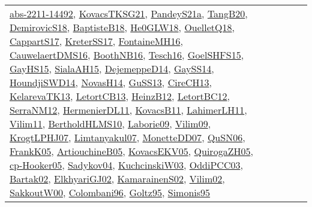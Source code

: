 {\begin{longtable}{lp{3cm}>{\raggedright}p{6cm}>{\raggedright}p{6cm}p{8cm}}
\href{articles/abs-2211-14492.pdf}{abs-2211-14492}\cite{abs-2211-14492}, \href{papers/KovacsTKSG21.pdf}{KovacsTKSG21}\cite{KovacsTKSG21}, \href{articles/PandeyS21a.pdf}{PandeyS21a}\cite{PandeyS21a}, \href{papers/TangB20.pdf}{TangB20}\cite{TangB20}, \href{papers/DemirovicS18.pdf}{DemirovicS18}\cite{DemirovicS18}, \href{articles/BaptisteB18.pdf}{BaptisteB18}\cite{BaptisteB18}, \href{papers/He0GLW18.pdf}{He0GLW18}\cite{He0GLW18}, \href{papers/OuelletQ18.pdf}{OuelletQ18}\cite{OuelletQ18}, \href{papers/CappartS17.pdf}{CappartS17}\cite{CappartS17}, \href{articles/KreterSS17.pdf}{KreterSS17}\cite{KreterSS17}, \href{papers/FontaineMH16.pdf}{FontaineMH16}\cite{FontaineMH16}, \href{papers/CauwelaertDMS16.pdf}{CauwelaertDMS16}\cite{CauwelaertDMS16}, \href{papers/BoothNB16.pdf}{BoothNB16}\cite{BoothNB16}, \href{papers/Tesch16.pdf}{Tesch16}\cite{Tesch16}, \href{articles/GoelSHFS15.pdf}{GoelSHFS15}\cite{GoelSHFS15}, \href{papers/GayHS15.pdf}{GayHS15}\cite{GayHS15}, \href{papers/SialaAH15.pdf}{SialaAH15}\cite{SialaAH15}, \href{papers/DejemeppeD14.pdf}{DejemeppeD14}\cite{DejemeppeD14}, \href{papers/GaySS14.pdf}{GaySS14}\cite{GaySS14}, \href{papers/HoundjiSWD14.pdf}{HoundjiSWD14}\cite{HoundjiSWD14}, \href{articles/NovasH14.pdf}{NovasH14}\cite{NovasH14}, \href{papers/GuSS13.pdf}{GuSS13}\cite{GuSS13}, \href{papers/CireCH13.pdf}{CireCH13}\cite{CireCH13}, \href{papers/KelarevaTK13.pdf}{KelarevaTK13}\cite{KelarevaTK13}, \href{papers/LetortCB13.pdf}{LetortCB13}\cite{LetortCB13}, \href{papers/HeinzB12.pdf}{HeinzB12}\cite{HeinzB12}, \href{papers/LetortBC12.pdf}{LetortBC12}\cite{LetortBC12}, \href{papers/SerraNM12.pdf}{SerraNM12}\cite{SerraNM12}, \href{papers/HermenierDL11.pdf}{HermenierDL11}\cite{HermenierDL11}, \href{articles/KovacsB11.pdf}{KovacsB11}\cite{KovacsB11}, \href{papers/LahimerLH11.pdf}{LahimerLH11}\cite{LahimerLH11}, \href{papers/Vilim11.pdf}{Vilim11}\cite{Vilim11}, \href{papers/BertholdHLMS10.pdf}{BertholdHLMS10}\cite{BertholdHLMS10}, \href{papers/Laborie09.pdf}{Laborie09}\cite{Laborie09}, \href{papers/Vilim09.pdf}{Vilim09}\cite{Vilim09}, \href{papers/KrogtLPHJ07.pdf}{KrogtLPHJ07}\cite{KrogtLPHJ07}, \href{papers/Limtanyakul07.pdf}{Limtanyakul07}\cite{Limtanyakul07}, \href{papers/MonetteDD07.pdf}{MonetteDD07}\cite{MonetteDD07}, \href{papers/QuSN06.pdf}{QuSN06}\cite{QuSN06}, \href{papers/FrankK05.pdf}{FrankK05}\cite{FrankK05}, \href{papers/ArtiouchineB05.pdf}{ArtiouchineB05}\cite{ArtiouchineB05}, \href{papers/KovacsEKV05.pdf}{KovacsEKV05}\cite{KovacsEKV05}, \href{papers/QuirogaZH05.pdf}{QuirogaZH05}\cite{QuirogaZH05}, \href{papers/cp-Hooker05.pdf}{cp-Hooker05}\cite{cp-Hooker05}, \href{papers/Sadykov04.pdf}{Sadykov04}\cite{Sadykov04}, \href{articles/KuchcinskiW03.pdf}{KuchcinskiW03}\cite{KuchcinskiW03}, \href{papers/OddiPCC03.pdf}{OddiPCC03}\cite{OddiPCC03}, \href{papers/Bartak02.pdf}{Bartak02}\cite{Bartak02}, \href{papers/ElkhyariGJ02.pdf}{ElkhyariGJ02}\cite{ElkhyariGJ02}, \href{papers/KamarainenS02.pdf}{KamarainenS02}\cite{KamarainenS02}, \href{papers/Vilim02.pdf}{Vilim02}\cite{Vilim02}, \href{articles/SakkoutW00.pdf}{SakkoutW00}\cite{SakkoutW00}, \href{papers/Colombani96.pdf}{Colombani96}\cite{Colombani96}, \href{papers/Goltz95.pdf}{Goltz95}\cite{Goltz95}, \href{papers/Simonis95.pdf}{Simonis95}\cite{Simonis95}\\

\end{longtable}}
